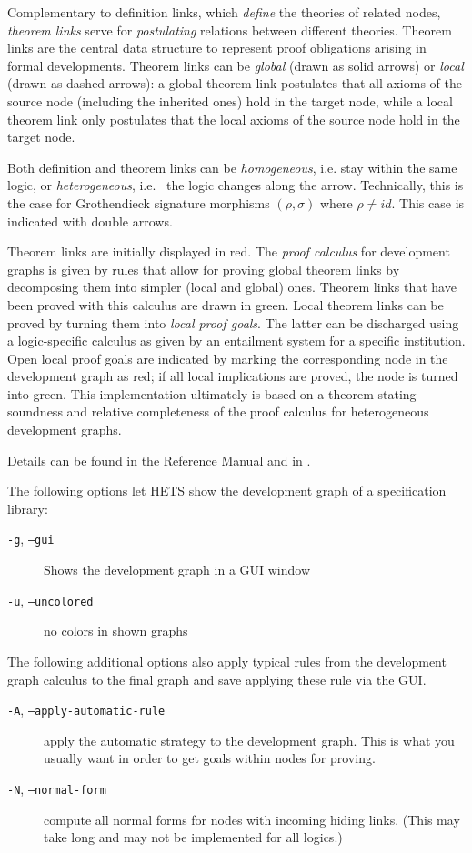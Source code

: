 \documentclass{article}
\newcommand{\normalTEXTSC}[2]{{#1\scriptsize#2}}
\newcommand     {\Hets}{\normalTEXTSC{H}{ETS}\xspace}
\begin{document}
Complementary to definition links, which \emph{define} the theories of
related nodes, \emph{theorem links} serve for \emph{postulating}
relations between different theories. Theorem links are the central
data structure to represent proof obligations arising in formal
developments.
Theorem links can be \emph{global} (drawn as solid arrows) or
\emph{local} (drawn as dashed arrows): a global theorem link
postulates that all axioms of the source node (including the inherited
ones) hold in the target node, while a local theorem link only postulates
that the local axioms of the source node hold in the target node.

Both definition and theorem links can be \emph{homogeneous},
i.e. stay within the same logic, or \emph{heterogeneous}, i.e.\ %
the logic changes along the arrow. Technically, this is the case
for Grothendieck signature morphisms $(\rho,\sigma)$ where
$\rho\not=id$. This case is indicated with double arrows.

Theorem links are initially displayed in red.
The \emph{proof calculus} for development graphs
\cite{MossakowskiEtAl05,Habil} is given by rules
that allow for proving global theorem links by decomposing them
into simpler (local and global) ones. Theorem links that have been
proved with this calculus are drawn in green. Local theorem links can
be proved by turning them into \emph{local proof goals}.  The latter
can be discharged using a logic-specific calculus as given by an
entailment system for a specific institution. Open local
proof goals are indicated by marking the corresponding node in the
development graph as red; if all local implications are proved, the
node is turned into green. This implementation ultimately is based
on a theorem \cite{Habil} stating soundness and relative completeness
of the proof calculus for heterogeneous development graphs.

Details can be found in the \CASL Reference Manual \cite[IV:4]{CASL/RefManual}
and in \cite{Habil,MossakowskiEtAl05,MossakowskiEtAl07b}.

The following options let \Hets show the development graph of
a specification library:
\begin{description}
\item[\texttt{-g}, \texttt{--gui}] Shows the development graph in a GUI window
\item[\texttt{-u}, \texttt{--uncolored}] no colors in shown graphs
\end{description}

The following additional options also apply typical rules from the development
graph calculus to the final graph and save applying these rule via the GUI.
\begin{description}
\item[\texttt{-A}, \texttt{--apply-automatic-rule}] apply the automatic
  strategy to the development graph. This is what you usually want in order to
  get goals within nodes for proving.
\item[\texttt{-N}, \texttt{--normal-form}] compute all normal forms for nodes
  with incoming hiding links. (This may take long and may not be implemented
  for all logics.)
\end{description}
\end{document}
